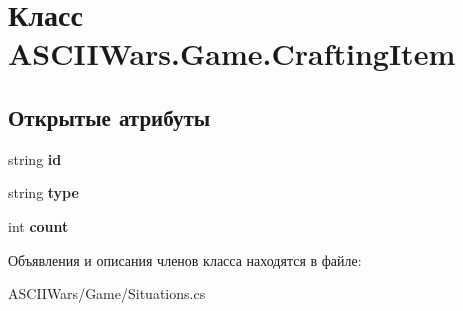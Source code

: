 \hypertarget{class_a_s_c_i_i_wars_1_1_game_1_1_crafting_item}{}\section{Класс A\+S\+C\+I\+I\+Wars.\+Game.\+Crafting\+Item}
\label{class_a_s_c_i_i_wars_1_1_game_1_1_crafting_item}
\subsection*{Открытые атрибуты}
\begin{DoxyCompactItemize}
\item 
\hypertarget{class_a_s_c_i_i_wars_1_1_game_1_1_crafting_item_a053928c27417f2ff248fae79f1e5adc3}{}\label{class_a_s_c_i_i_wars_1_1_game_1_1_crafting_item_a053928c27417f2ff248fae79f1e5adc3} 
string {\bfseries id}
\item 
\hypertarget{class_a_s_c_i_i_wars_1_1_game_1_1_crafting_item_a18242bdb01042b4a85c92fdb3bff0d05}{}\label{class_a_s_c_i_i_wars_1_1_game_1_1_crafting_item_a18242bdb01042b4a85c92fdb3bff0d05} 
string {\bfseries type}
\item 
\hypertarget{class_a_s_c_i_i_wars_1_1_game_1_1_crafting_item_af27ae0339fb398e1e2a8d554c7909630}{}\label{class_a_s_c_i_i_wars_1_1_game_1_1_crafting_item_af27ae0339fb398e1e2a8d554c7909630} 
int {\bfseries count}
\end{DoxyCompactItemize}


Объявления и описания членов класса находятся в файле\+:\begin{DoxyCompactItemize}
\item 
A\+S\+C\+I\+I\+Wars/\+Game/Situations.\+cs\end{DoxyCompactItemize}
